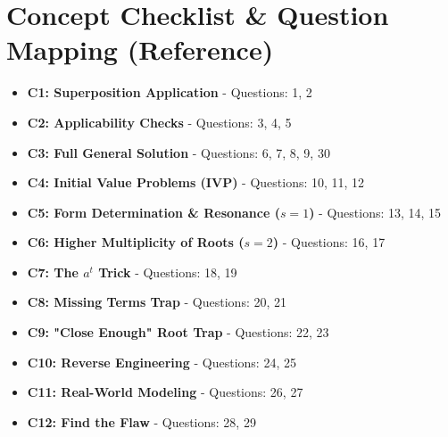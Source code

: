 \documentclass[11pt]{article}
\begin{document}
\section{Concept Checklist \& Question Mapping (Reference)}
\begin{itemize}
    \item \textbf{C1: Superposition Application} - Questions: 1, 2
    \item \textbf{C2: Applicability Checks} - Questions: 3, 4, 5
    \item \textbf{C3: Full General Solution} - Questions: 6, 7, 8, 9, 30
    \item \textbf{C4: Initial Value Problems (IVP)} - Questions: 10, 11, 12
    \item \textbf{C5: Form Determination \& Resonance ($s=1$)} - Questions: 13, 14, 15
    \item \textbf{C6: Higher Multiplicity of Roots ($s=2$)} - Questions: 16, 17
    \item \textbf{C7: The $a^t$ Trick} - Questions: 18, 19
    \item \textbf{C8: Missing Terms Trap} - Questions: 20, 21
    \item \textbf{C9: "Close Enough" Root Trap} - Questions: 22, 23
    \item \textbf{C10: Reverse Engineering} - Questions: 24, 25
    \item \textbf{C11: Real-World Modeling} - Questions: 26, 27
    \item \textbf{C12: Find the Flaw} - Questions: 28, 29
\end{itemize}
\end{document}

